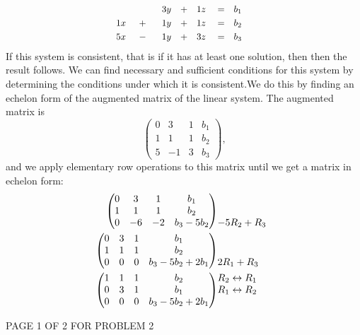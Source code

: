 \documentclass[12pt]{article}
\newenvironment{problem}[2][Problem]
{
	\begin{trivlist} 
		\item[\hskip \labelsep {\bfseries #1 #2:}]
	}
{
	\end{trivlist}
	}
\newenvironment{solution}[1][Solution]
{
	\begin{trivlist} 
		\item[\hskip \labelsep {\itshape #1:}]
	}
	{
	\end{trivlist}
}
\begin{document}
\begin{problem}{2}
\begin{solution}
\begin{align*}
&&&&&&&& &&&&&&&& &&&&&&&& &\hphantom{500}& &\hphantom{500}& &3y& &+& &1z& &=& &b_1& &&&&&&&& &&&&&&&& &&&&&&&&\\
&&&&&&&& &&&&&&&& &&&&&&&& &1x& &+& &1y& &+& &1z& &=& &b_2& &&&&&&&& &&&&&&&& &&&&&&&&\\
&&&&&&&& &&&&&&&& &&&&&&&& &5x& &-& &1y& &+& &3z& &=& &b_3& &&&&&&&& &&&&&&&& &&&&&&&&
\end{align*}
If this system is consistent, that is if it has at least one solution, then then the result follows. We can find necessary and sufficient conditions for this system by determining the conditions under which it is consistent.We do this by finding an echelon form of the augmented matrix of the linear system. The augmented matrix is
\[
\begin{pmatrix}0&3&1&b_1\\1&1&1&b_2\\5&-1&3&b_3\end{pmatrix}\text{,}
\]
and we apply elementary row operations to this matrix until we get a matrix in echelon form:
\begin{align*}
\begin{pmatrix}0&3&1&b_1\\1&1&1&b_2\\0&-6&-2&b_3-5b_2\end{pmatrix}
&\begin{matrix}\hphantom{1}\\\hphantom{1}\\-5R_2+R_3\hphantom{1}\end{matrix}\\
\begin{pmatrix}0&3&1&b_1\\1&1&1&b_2\\0&0&0&b_3-5b_2+2b_1\end{pmatrix}
&\begin{matrix}\hphantom{1}\\\hphantom{1}\\2R_1+R_3\hphantom{1}\end{matrix}\\
\begin{pmatrix}1&1&1&b_2\\0&3&1&b_1\\0&0&0&b_3-5b_2+2b_1\end{pmatrix}
&\begin{matrix}R_2 \leftrightarrow R_1 \hphantom{1}\\R_1 \leftrightarrow R_2\hphantom{1}\\\hphantom{1}\end{matrix}\\
\end{align*}
\end{solution}
\vfill
\centerline{PAGE 1 OF 2 FOR PROBLEM 2}
\end{problem}
\end{document}
